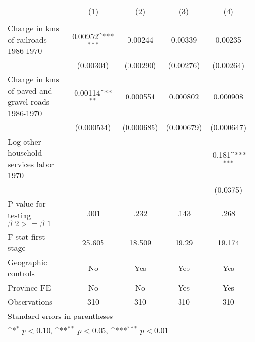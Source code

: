 {
\def\sym#1{\ifmmode^{#1}\else\(^{#1}\)\fi}
\begin{tabular}{l*{4}{c}}
\hline\hline
                &\multicolumn{1}{c}{(1)}&\multicolumn{1}{c}{(2)}&\multicolumn{1}{c}{(3)}&\multicolumn{1}{c}{(4)}\\
                &\multicolumn{1}{c}{}&\multicolumn{1}{c}{}&\multicolumn{1}{c}{}&\multicolumn{1}{c}{}\\
\hline
Change in kms of railroads 1986-1970&  0.00952\sym{***}&  0.00244         &  0.00339         &  0.00235         \\
                &(0.00304)         &(0.00290)         &(0.00276)         &(0.00264)         \\
[1em]
Change in kms of paved and gravel roads 1986-1970&  0.00114\sym{**} & 0.000554         & 0.000802         & 0.000908         \\
                &(0.000534)         &(0.000685)         &(0.000679)         &(0.000647)         \\
[1em]
Log other household services labor 1970&                  &                  &                  &   -0.181\sym{***}\\
                &                  &                  &                  & (0.0375)         \\
\hline
P-value for testing $\beta\_{2} >= \beta\_{1}$&     .001         &     .232         &     .143         &     .268         \\
F-stat first stage&   25.605         &   18.509         &    19.29         &   19.174         \\
Geographic controls&       No         &      Yes         &      Yes         &      Yes         \\
Province FE     &       No         &       No         &      Yes         &      Yes         \\
Observations    &      310         &      310         &      310         &      310         \\
\hline\hline
\multicolumn{5}{l}{\footnotesize Standard errors in parentheses}\\
\multicolumn{5}{l}{\footnotesize \sym{*} \(p<0.10\), \sym{**} \(p<0.05\), \sym{***} \(p<0.01\)}\\
\end{tabular}
}
